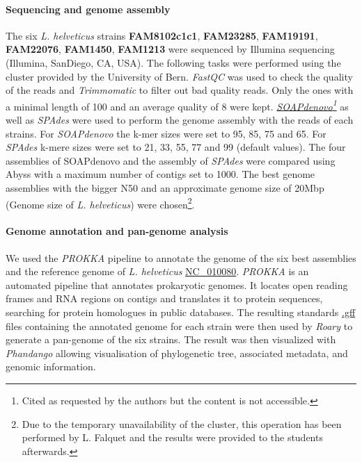 \documentclass[10pt,a4paper]{article}
\begin{document}
\paragraph{Sequencing and genome assembly}
The six \textit{L. helveticus} strains \textbf{FAM8102c1c1}, \textbf{FAM23285}, \textbf{FAM19191}, \textbf{FAM22076}, \textbf{FAM1450}, \textbf{FAM1213}  were sequenced by Illumina sequencing (Illumina, SanDiego, CA, USA). The following tasks were performed using the cluster provided by the University of Bern.  \textit{FastQC}\cite{andrews2012} was used to check the quality of the reads and \textit{Trimmomatic}\cite{bolger_trimmomatic:_2014} to filter out bad quality reads. Only the ones with a minimal length of 100 and an average quality of 8 were kept. \textit{\href{http://www.gigasciencejournal.com/content/1/1/18/}{SOAPdenovo}\footnote{Cited as requested by the authors but the content is not accessible.}} as well as \textit{SPAdes}\cite{hutchison_assembling_2013} were used to perform the genome assembly with the reads of each strains. For \textit{SOAPdenovo} the k-mer sizes were set to 95, 85, 75 and 65. For \textit{SPAdes} k-mere sizes were set to 21, 33, 55, 77 and 99 (default values). The four assemblies of SOAPdenovo and the assembly of \textit{SPAdes} were compared using Abyss\cite{simpson_abyss:_2009} with a maximum number of contigs set to 1000. The best genome assemblies with the bigger N50 and an approximate genome size of 20Mbp (Genome size of \textit{L. helveticus}) were chosen\footnote{Due to the temporary unavailability of the cluster, this operation has been performed by L. Falquet and the results were provided to the students afterwards.}.






\paragraph{Genome annotation and pan-genome analysis}
We used the \textit{PROKKA} pipeline\cite{seemann_prokka:_2014} to annotate the genome of the six best assemblies and the reference genome of \textit{L. helveticus} \href{https://www.ncbi.nlm.nih.gov/genome/?term=NC_010080}{NC\_010080}. \textit{PROKKA} is an automated pipeline that annotates prokaryotic genomes. It locates open reading frames and RNA regions on contigs and translates it to protein sequences, searching for protein homologues in public databases. The resulting standards \href{https://www.ensembl.org/info/website/upload/gff.html}{.gff} files containing the annotated genome for each strain were then used by \textit{Roary}\cite{page_roary:_2015} to generate a pan-genome of the six strains. The result was then visualized with \textit{Phandango}\cite{hadfield_phandango:_2018} allowing visualisation of phylogenetic tree, associated metadata, and genomic information.
\end{document}
